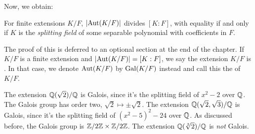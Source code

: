 Now, we obtain:
\begin{theorem}
	For finite extensions $K/F$,
	$\left\lvert \operatorname{Aut}(K/F) \right\rvert$ divides $[K:F]$,
	with equality if and only if $K$ is the \emph{splitting field}
	of some separable polynomial with coefficients in $F$.
	\label{thm:Galois_splitting}
\end{theorem}
The proof of this is deferred to an optional section at the end of the chapter.
If $K/F$ is a finite extension and $\left\lvert \operatorname{Aut}(K/F) \right\rvert = [K:F]$,
we say the extension $K/F$ is .
In that case, we denote $\operatorname{Aut}(K/F)$ by $\operatorname{Gal}(K/F)$ instead
and call this the  of $K/F$.

\begin{example}
	\listhack
	\begin{enumerate}[(a)]
		\ii The extension $\mathbb Q(\sqrt2) / \mathbb Q$ is Galois,
		since it's the splitting field of $x^2-2$ over $\mathbb Q$.
		The Galois group has order two, $\sqrt 2 \mapsto \pm \sqrt 2$.
		\ii The extension $\mathbb Q(\sqrt2, \sqrt 3) / \mathbb Q$ is Galois,
		since it's the splitting field of $(x^2-5)^2-24$ over $\mathbb Q$.
		As discussed before, the Galois group is $\mathbb Z/2\mathbb Z \times \mathbb Z/2\mathbb Z$.
		\ii The extension $\mathbb Q(\sqrt[3]{2}) / \mathbb Q$ is \emph{not} Galois.
	\end{enumerate}
\end{example}


